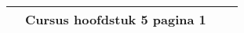 \begin{landscape}
\begin{tabularx}{1.56\textwidth}{|p{1.5cm}|p{9cm}|X|p{4cm}|}
	
	&  Cursus hoofdstuk 5 pagina 1
	\\ \hline
\end{tabularx}


	
\end{landscape}



%
%
%
%
%
%
%
%
%
%